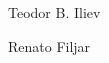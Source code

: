\documentclass[sn-mathphys-num]{sn-jnl}%
\begin{document}
Teodor B. Iliev

Renato Filjar


\end{document}
